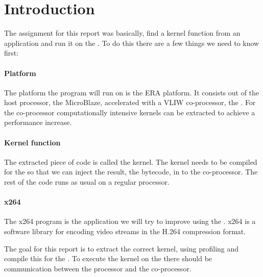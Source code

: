 \section{Introduction}

The assignment for this report was basically, find a kernel function from an
application and run it on the \rvex{}. To do this there are a few things we
need to know first:

\paragraph{Platform} The platform the program will run on is the ERA platform.
It consists out of the host processor, the MicroBlaze, accelerated with a
VLIW co-processor, the \rvex{}. For the co-processor computationally intensive
kernels can be extracted to achieve a performance increase.

\paragraph{Kernel function} The extracted piece of code is called the kernel.
The kernel needs to be compiled for the \rvex{} so that we can inject the
result, the bytecode, in to the co-processor. The rest of the code runs as
usual on a regular processor.

\paragraph{x264} The x264 program is the application we will try to improve
using the \rvex{}. x264 is a software library for encoding video streams
in the H.264 compression format.

The goal for this report is to extract the correct kernel, using profiling and
compile this for the \rvex{}. To execute the kernel on the \rvex{} there should
be communication between the processor and the co-processor.
